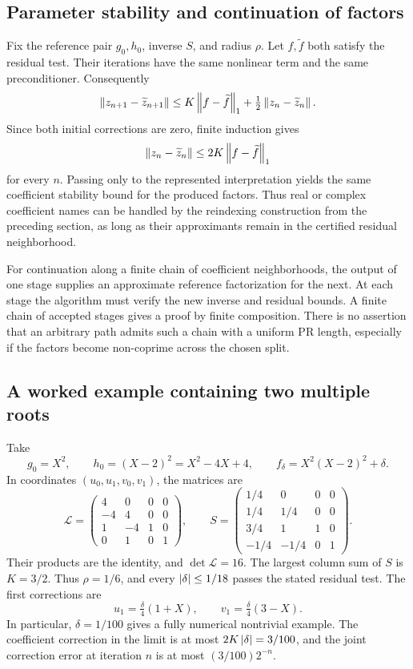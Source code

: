 \subsection{Parameter stability and continuation of factors}

Fix the reference pair \(g_0,h_0\), inverse \(S\), and radius \(\rho\). Let \(f,\widetilde f\) both satisfy the residual test. Their iterations have the same nonlinear term and the same preconditioner. Consequently
\[
 \left\lVert z_{n+1}-\widetilde z_{n+1}\right\rVert
 \le K\left\lVert f-\widetilde f\right\rVert_1+\tfrac12\left\lVert z_n-\widetilde z_n\right\rVert.
\]
Since both initial corrections are zero, finite induction gives
\begin{equation}\label{eq:factorstability}
 \left\lVert z_n-\widetilde z_n\right\rVert\le2K\left\lVert f-\widetilde f\right\rVert_1
\end{equation}
for every \(n\). Passing only to the represented interpretation yields the same coefficient stability bound for the produced factors. Thus real or complex coefficient names can be handled by the reindexing construction from the preceding section, as long as their approximants remain in the certified residual neighborhood.

For continuation along a finite chain of coefficient neighborhoods, the output of one stage supplies an approximate reference factorization for the next. At each stage the algorithm must verify the new inverse and residual bounds. A finite chain of accepted stages gives a proof by finite composition. There is no assertion that an arbitrary path admits such a chain with a uniform PR length, especially if the factors become non-coprime across the chosen split.

\subsection{A worked example containing two multiple roots}

Take
\[
 g_0=X^2,\qquad h_0=(X-2)^2=X^2-4X+4,
 \qquad f_\delta=X^2(X-2)^2+\delta.
\]
In coordinates \((u_0,u_1,v_0,v_1)\), the matrices are
\[
 \mathcal L=
 \begin{pmatrix}
 4&0&0&0\\-4&4&0&0\\1&-4&1&0\\0&1&0&1
 \end{pmatrix},\qquad
 S=\begin{pmatrix}
 1/4&0&0&0\\1/4&1/4&0&0\\3/4&1&1&0\\-1/4&-1/4&0&1
 \end{pmatrix}.
\]
Their products are the identity, and \(\det\mathcal L=16\). The largest column sum of \(S\) is \(K=3/2\). Thus \(\rho=1/6\), and every \(\left|\delta\right|\le1/18\) passes the stated residual test. The first corrections are
\[
 u_1=\tfrac\delta4(1+X),\qquad
 v_1=\tfrac\delta4(3-X).
\]
In particular, \(\delta=1/100\) gives a fully numerical nontrivial example. The coefficient correction in the limit is at most
\(2K\left|\delta\right|=3/100\), and the joint correction error at iteration \(n\) is at most \((3/100)2^{-n}\).

